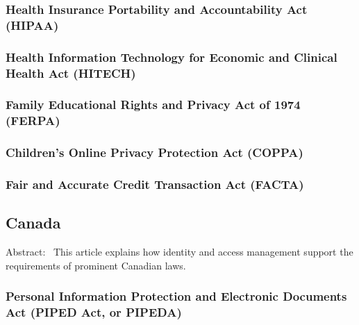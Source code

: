 \hypertarget{health-insurance-portability-and-accountability-act-hipaa}{%
\subsubsection{Health Insurance Portability and Accountability Act
(HIPAA)}\label{health-insurance-portability-and-accountability-act-hipaa}}

\hypertarget{health-information-technology-for-economic-and-clinical-health-act-hitech}{%
\subsubsection{Health Information Technology for Economic and Clinical
Health Act
(HITECH)}\label{health-information-technology-for-economic-and-clinical-health-act-hitech}}

\hypertarget{family-educational-rights-and-privacy-act-of-1974-ferpa}{%
\subsubsection{Family Educational Rights and Privacy Act of 1974
(FERPA)}\label{family-educational-rights-and-privacy-act-of-1974-ferpa}}

\hypertarget{childrens-online-privacy-protection-act-coppa}{%
\subsubsection{Children's Online Privacy Protection Act
(COPPA)}\label{childrens-online-privacy-protection-act-coppa}}

\hypertarget{fair-and-accurate-credit-transaction-act-facta}{%
\subsubsection{Fair and Accurate Credit Transaction Act
(FACTA)}\label{fair-and-accurate-credit-transaction-act-facta}}

\hypertarget{canada}{%
\subsection{Canada}\label{canada}}

Abstract:~ This article explains how identity and access management
support the requirements of prominent Canadian laws.

\hypertarget{personal-information-protection-and-electronic-documents-act-piped-act-or-pipeda}{%
\subsubsection{Personal Information Protection and Electronic Documents Act
(PIPED Act, or
PIPEDA)}\label{personal-information-protection-and-electronic-documents-act-piped-act-or-pipeda}}

